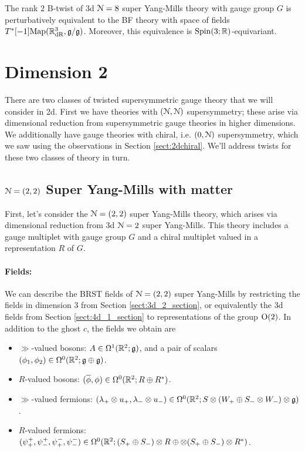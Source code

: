 \documentclass[10pt, oneside]{article}
\begin{document}
\begin{theorem} 
The rank $2$ B-twist of 3d $\mathcal{N}=8$ super Yang-Mills theory with gauge group $G$ is perturbatively equivalent to the BF theory with space of fields $T^*[-1]\mathrm{Map}(\mathbb R^3_{\mathrm{dR}}, \mathfrak{g}/\mathfrak{g})$. Moreover, this equivalence is $\mathrm{Spin}(3;\mathbb R)$-equivariant.
\end{theorem}

\section{Dimension 2}

There are two classes of twisted supersymmetric gauge theory that we will consider in 2d.  First we have theories with $(\mathcal{N}, \mathcal{N})$ supersymmetry; these arise via dimensional reduction from supersymmetric gauge theories in higher dimensions.  We additionally have gauge theories with chiral, i.e. $(0,\mathcal{N})$ supersymmetry, which we saw using the observations in Section \ref{sect:2dchiral}.  We'll address twists for these two classes of theory in turn.

\subsection{\texorpdfstring{$\mathcal N=(2,2)$}{N=(2,2)} Super Yang-Mills with matter} \label{sect:2d(2,2)}
First, let's consider the $\mathcal{N}=(2,2)$ super Yang-Mills theory, which arises via dimensional reduction from 3d $\mathcal{N}=2$ super Yang-Mills.  This theory includes a gauge multiplet with gauge group $G$ and a chiral multiplet valued in a representation $R$ of $G$.

\vspace{-10pt}
\paragraph{Fields:} We can describe the BRST fields of $\mathcal{N}=(2,2)$ super Yang-Mills by restricting the fields in dimension 3 from Section \ref{sect:3d_2_section}, or equivalently the 3d fields from Section \ref{sect:4d_1_section} to representations of the group $\mathrm{O}(2)$.  In addition to the ghost $c$, the fields we obtain are
\begin{itemize}
 \item $\gg$-valued bosons: $A \in \Omega^1(\mathbb R^2; \mathfrak{g})$, and a pair of scalars $(\phi_1,\phi_2) \in \Omega^0(\mathbb R^2; \mathfrak{g} \oplus \mathfrak{g})$.
 \item $R$-valued bosons: $(\overline{\phi}, \phi) \in \Omega^0(\mathbb R^2 ; R \oplus R^*)$.
 \item $\gg$-valued fermions: $(\lambda_+ \otimes u_+,\lambda_- \otimes u_-) \in \Omega^0(\mathbb R^2 ; S \otimes (W_+ \oplus S_- \otimes W_-) \otimes \mathfrak{g})$.
 \item $R$-valued fermions: $(\psi^+_+,\psi^+_-, \psi^-_+, \psi^-_-) \in \Omega^0(\mathbb R^2 ; (S_+ \oplus S_-) \otimes R \oplus \otimes (S_+ \oplus S_-) \otimes R^*)$.
\end{itemize}
\end{document}

